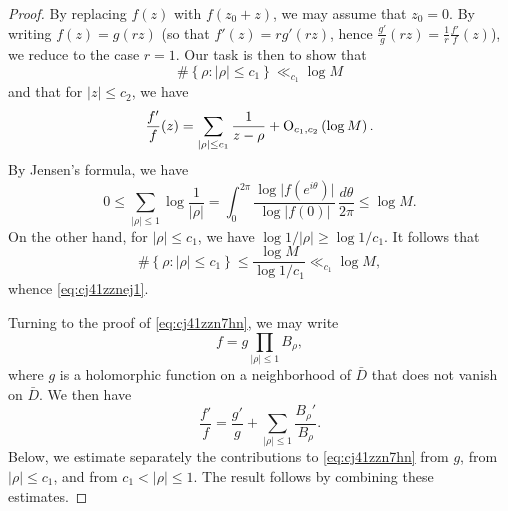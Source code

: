 \documentclass[reqno]{amsart} 
\begin{document}
\begin{proof}
  By replacing $f(z)$ with $f(z_0 + z)$, we may assume that $z_0 = 0$.  By writing $f(z) = g( r z)$ (so that $f'(z) = r g'(r z)$, hence $\frac{g'}{g}(r z) = \frac{1}{r} \frac{f'}{f}(z)$), we reduce to the case $r = 1$. Our task is then to show that
  \begin{equation}\label{eq:cj41zznej1}
    \# \left\{ \rho : \lvert \rho  \rvert \leq c_1 \right\} \ll_{c_1} \log M
  \end{equation}
  and that for $\lvert z \rvert \leq c_2$, we have
  \begin{equation}\label{eq:cj41zzn7hn}
    \frac{f ' }{f}(z) = \sum_{\lvert \rho \rvert \leq c_1}
    \frac{1}{z - \rho }
    + \operatorname{O}_{c_1, c_2} \left( \log M \right).
  \end{equation}
  By Jensen's formula, we have
  \begin{equation}\label{eq:cj41zzjhfa}
    0 \leq \sum_{\lvert \rho \rvert \leq 1} \log \frac{1}{\lvert \rho \rvert} = \int_0^{2 \pi} \frac{\log \lvert f (e^{i \theta }) \rvert}{\log \lvert f(0) \rvert} \, \frac{d \theta }{ 2 \pi } \leq \log M.
  \end{equation}
  On the other hand, for $\lvert \rho \rvert \leq c_1$, we have $\log 1 / \lvert \rho \rvert \geq \log 1/c_1$.  It follows that
  \begin{equation*}
    \# \left\{ \rho : \lvert \rho  \rvert \leq c_1 \right\}
    \leq \frac{\log M}{ \log 1/c_1} \ll_{c_1} \log M,
  \end{equation*}
  whence \eqref{eq:cj41zznej1}.
  
  Turning to the proof of \eqref{eq:cj41zzn7hn}, we may write
  \begin{equation*}
    f = g \prod_{|\rho| \leq 1} B_\rho,
  \end{equation*}
  where $g$ is a holomorphic function on a neighborhood of $\bar{D}$ that does not vanish on $\bar{D}$.  We then have
  \begin{equation*}
    \frac{f'}{f} = \frac{g'}{g} + \sum_{\lvert \rho \rvert \leq 1} \frac{B_\rho '}{B_\rho}.
  \end{equation*}
  Below, we estimate separately the contributions to \eqref{eq:cj41zzn7hn} from $g$, from $\lvert \rho \rvert \leq c_1$, and from $c_1 < \lvert \rho \rvert \leq 1$.  The result follows by combining these estimates.


\end{proof}
\end{document}
